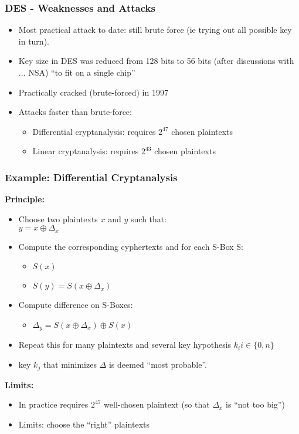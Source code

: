 \documentclass[
hyperref={pdfpagelabels=false}
,xcolor=table
]
{beamer}
\newcommand{\minus}{{\texttt{[image: minus.png]}}}
\begin{document}
\begin{frame}
  \frametitle{DES - Weaknesses and Attacks}

  \begin{itemize}
  \item Most practical attack to date: still brute force (ie trying out all possible key in turn).
  \item Key size in DES was reduced from 128 bits to 56 bits (after discussions with ... NSA) ``to fit on a single chip''
  \item Practically cracked (brute-forced) in 1997
  \item Attacks faster than brute-force:
    \begin{itemize}
    \item Differential cryptanalysis: requires $2^{47}$ chosen plaintexts
    \item Linear cryptanalysis: requires $2^{43}$ chosen plaintexts
    \end{itemize}
  \end{itemize}
\end{frame}


\begin{frame}
  \frametitle{Example: Differential Cryptanalysis}
  
  \textbf{Principle:}
  \begin{itemize}
  \item Choose two plaintexts $x$ and $y$ such that: \\
    $y = x \oplus \Delta_x$
  \item Compute the corresponding cyphertexts and for each S-Box S: 
    \begin{itemize}
    \item $S(x)$
    \item $S(y) = S(x \oplus \Delta_x)$
    \end{itemize}
  \item Compute difference on S-Boxes:
    \begin{itemize}
    \item $\Delta_y = S(x \oplus \Delta_x) \oplus S(x)$
    \end{itemize}
  \item Repeat this for many plaintexts and several key hypothesis $k_i i \in \{0, n\}$
  \item key $k_j$ that minimizes $\Delta$ is deemed ``most probable''.
  \end{itemize}

  \textbf{Limits: }
  \begin{itemize}
  \item[\minus] In practice requires $2^{47}$ well-chosen plaintext (so that $\Delta_x$ is ``not too big'')
  \item[\minus] Limits: choose the ``right'' plaintexts
  \end{itemize}
\end{frame}
\end{document}
